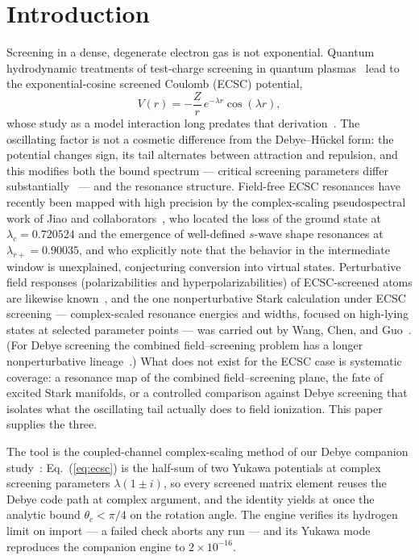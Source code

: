 \documentclass[aps,pre,twocolumn,superscriptaddress,floatfix,longbibliography]{revtex4-2}
\begin{document}
\section{Introduction}

Screening in a dense, degenerate electron gas is not exponential.
Quantum hydrodynamic treatments of test-charge screening in quantum
plasmas~\cite{ShuklaEliasson2008} lead to the exponential-cosine
screened Coulomb (ECSC) potential,
\begin{equation}
V(r)=-\frac{Z}{r}\,e^{-\lambda r}\cos(\lambda r),
\label{eq:ecsc}
\end{equation}
whose study as a model interaction long predates that
derivation~\cite{LamVarshni1972}. The oscillating factor is not a
cosmetic difference from the Debye--H\"uckel form: the potential
changes sign, its tail alternates between attraction and repulsion,
and this modifies both the bound spectrum --- critical screening
parameters differ substantially~\cite{JiaoCritical2021} --- and the
resonance structure. Field-free ECSC resonances have recently been
mapped with high precision by the complex-scaling pseudospectral
work of Jiao and collaborators~\cite{JiaoHo2021}, who located the
loss of the ground state at $\lambda_c=0.720524$ and the emergence
of well-defined $s$-wave shape resonances at
$\lambda_{r+}=0.90035$, and who explicitly note that the behavior in
the intermediate window is unexplained, conjecturing conversion into
virtual states. Perturbative field responses (polarizabilities and
hyperpolarizabilities) of ECSC-screened atoms are likewise
known~\cite{PRE2023polarizabilities}, and the one nonperturbative
Stark calculation under ECSC screening --- complex-scaled resonance
energies and widths, focused on high-lying states at selected
parameter points --- was carried out by Wang, Chen, and
Guo~\cite{WangChenGuo2019}. (For Debye screening the combined
field--screening problem has a longer nonperturbative
lineage~\cite{YuHo2005,LinHo2011,companionD}.) What does not exist
for the ECSC case is systematic coverage: a resonance map of the
combined field--screening plane, the fate of excited Stark
manifolds, or a controlled comparison against Debye screening that
isolates what the oscillating tail actually does to field
ionization. This paper supplies the three.

The tool is the coupled-channel complex-scaling method of our Debye
companion study~\cite{companionD}: Eq.~(\ref{eq:ecsc}) is the
half-sum of two Yukawa potentials at complex screening parameters
$\lambda(1\pm i)$, so every screened matrix element reuses the
Debye code path at complex argument, and the identity yields at
once the analytic bound $\theta_c<\pi/4$ on the rotation angle.
The engine verifies its hydrogen limit on import --- a failed check
aborts any run --- and its Yukawa mode reproduces the companion
engine to $2\times10^{-16}$.
\end{document}
